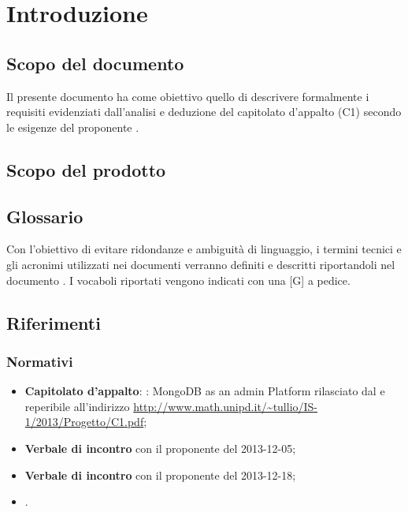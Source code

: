 \section{Introduzione}


\subsection{Scopo del documento}
Il presente documento ha come obiettivo quello di descrivere formalmente i requisiti evidenziati dall'analisi e deduzione del capitolato d'appalto \ProjectName{} (C1) secondo le esigenze del proponente \Proponente{}.

\subsection{Scopo del prodotto} 
\ScopoDelProdotto

\subsection{Glossario}
Con l'obiettivo di evitare ridondanze e ambiguità di linguaggio, i termini tecnici e gli acronimi utilizzati nei documenti verranno definiti e descritti riportandoli nel documento \Glossario{}. I vocaboli riportati vengono indicati con una [G] a pedice.

\subsection{Riferimenti}
	\subsubsection{Normativi}
	\begin{itemize}
	\item \textbf{Capitolato d'appalto}: \ProjectName{}: MongoDB as an admin Platform rilasciato dal  \Proponente{} e reperibile all'indirizzo \url{http://www.math.unipd.it/~tullio/IS-1/2013/Progetto/C1.pdf};
	\item \textbf{Verbale di incontro} con il proponente \Proponente{} del 2013-12-05;
	\item \textbf{Verbale di incontro} con il proponente \Proponente{} del 2013-12-18;
	\item \textbf{\NormeDiProgetto{}}. 
	\end{itemize}
	
	
